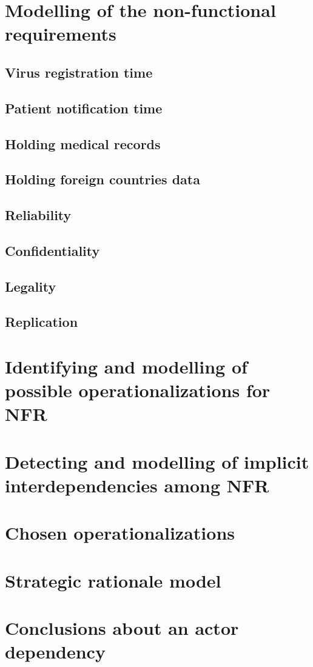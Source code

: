 \documentclass{VUMIFPSkursinis}
\begin{document}
\section{Modelling of the non-functional requirements}
	\subsection{Virus registration time}
	\subsection{Patient notification time}
	\subsection{Holding medical records}
	\subsection{Holding foreign countries data}
	\subsection{Reliability}
	\subsection{Confidentiality}
	\subsection{Legality}
	\subsection{Replication}

\section{Identifying and modelling of possible operationalizations for NFR}

\section{Detecting and modelling of implicit interdependencies among NFR}

\section{Chosen operationalizations}

\section{Strategic rationale model}

\section{Conclusions about an actor dependency}

\end{document}
